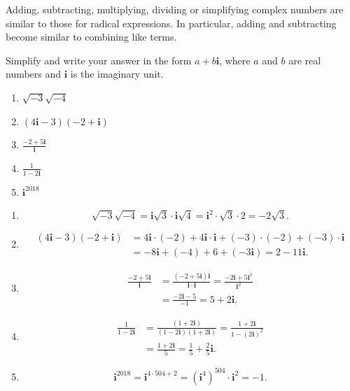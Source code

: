 \documentclass[en,12pt]{elegantbook}
\providecommand{\tightlist}{%
  \setlength{\itemsep}{0pt}\setlength{\parskip}{0pt}}
\newcommand{\ii}{\mathbf{i}}
\providecommand{\tightlist}{%
  \setlength{\itemsep}{0pt}\setlength{\parskip}{0pt}}
\let\BeginKnitrBlock\begin \let\EndKnitrBlock\end
\begin{document}
Adding, subtracting, multiplying, dividing or simplifying complex numbers are similar to those for radical expressions. In particular, adding and subtracting become similar to combining like terms.

\BeginKnitrBlock{example}
\protect\hypertarget{exm:unnamed-chunk-81}{}{\label{exm:unnamed-chunk-81} }
Simplify and write your answer in the form \(a+b\ii\), where \(a\) and \(b\) are real numbers and \(\ii\) is the imaginary unit.

\begin{enumerate}
\def\labelenumi{\arabic{enumi}.}
\tightlist
\item
  \(\sqrt{-3}\sqrt{-4}\)
\item
  \((4\ii-3)(-2+\ii)\)
\item
  \(\frac{-2+5\ii}{\ii}\)
\item
  \(\frac{1}{1-2\ii}\)
\item
  \(\ii^{2018}\)
\end{enumerate}
\EndKnitrBlock{example}

\BeginKnitrBlock{solution}


\begin{enumerate}
\def\labelenumi{\arabic{enumi}.}
\tightlist
\item
  \[
    \sqrt{-3}\sqrt{-4}=\ii\sqrt{3}\cdot\ii\sqrt{4}=\ii^2\cdot \sqrt3\cdot 2=-2\sqrt{3}.
  \]
\item
  \[
    \begin{split}
        (4\ii-3)(-2+\ii)&=4\ii\cdot(-2)+4\ii\cdot \ii+(-3)\cdot(-2)+(-3)\cdot\ii \\
        &=-8\ii+(-4)+6+(-3\ii)=2-11\ii.
    \end{split}
  \]
\item
  \[
    \begin{split}
        \frac{-2+5\ii}{\ii}&=\frac{(-2+5\ii)\ii}{\ii\cdot \ii}=\frac{-2\ii+5\ii^2}{\ii^2}\\
        &=\frac{-2\ii-5}{-1}=5+2\ii.
    \end{split}
  \]
\item
  \[
    \begin{split}
        \frac{1}{1-2\ii}&=\frac{(1+2\ii)}{(1-2\ii)(1+2\ii)}=\frac{1+2\ii}{1-(2\ii)^2}\\
        &=\frac{1+2\ii}{5}=\frac{1}{5}+\frac{2}{5}\ii.
    \end{split}
  \]
\item
  \[
    \ii^{2018}=\ii^{4\cdot 504+2}=(\ii^4)^{504}\cdot \ii^2=-1.
  \]
\end{enumerate}
\EndKnitrBlock{solution}
\end{document}
